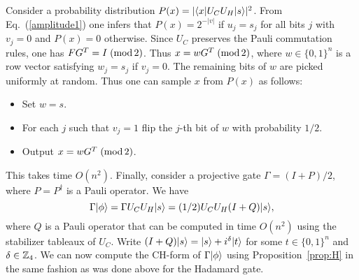 Consider a probability distribution $P(x)=|\langle x|U_CU_H|s\rangle|^2$.
From Eq.~(\ref{amplitude1}) one infers that 
$P(x)=2^{-|v|}$ if $u_j=s_j$ for all bits $j$ with $v_j=0$
and $P(x)=0$ otherwise. 
Since $U_C$ preserves the Pauli commutation rules, one has 
$FG^T=I \; (\mathrm{mod}\, 2)$.  Thus
$x=wG^T\; (\mathrm{mod}\, 2)$, where $w\in \{0,1\}^n$ is a row vector satisfying $w_j=s_j$ if $v_j=0$.
The remaining bits of $w$ are picked uniformly at random.  
Thus one can sample $x$ from $P(x)$ as follows:
\begin{itemize}
\item Set $w=s$.
\item For each $j$ such that $v_j=1$ flip the $j$-th bit of $w$ with probability $1/2$.
\item Output $x=wG^T \; (\mathrm{mod}\, 2)$.
\end{itemize}
This takes time $O(n^2)$.
Finally, consider a projective gate $\Gamma=(I+P)/2$, where $P=P^\dag$ is a Pauli operator.
We have 
\[
\Gamma |\phi\rangle=\Gamma U_C U_H |s\rangle = (1/2)U_C U_H(I+ Q)|s\rangle,
\]
where $Q$ is a Pauli operator that can be computed in time  $O(n^2)$ using the
stabilizer tableaux of $U_C$. 
Write $(I+Q)|s\rangle=|s\rangle + i^\delta |t\rangle$ for some $t\in \{0,1\}^n$ and $\delta\in\mathbb{Z}_4$.
We can now compute the CH-form of $\Gamma|\phi\rangle$ using Proposition~\ref{prop:H}
in the same fashion as was done above for the Hadamard gate.

